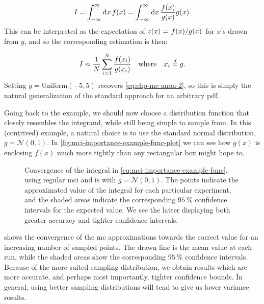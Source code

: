 \documentclass[Thesis.tex]{subfiles}
\begin{document}
\begin{align}
    I = \int_{-\infty}^{\infty}\dd{x}f(x) = \int_{-\infty}^{\infty}\dd{x} \frac{f(x)}{g(x)} g(x).
\end{align}
This can be interpreted as the expectation of $z(x)=\flatfrac{f(x)}{g(x)}$ for $x$'s drawn from $g$, and so the corresponding estimation is then:

\begin{align}
    I \approx \frac{1}{N} \sum_{i=1}^N \frac{f(x_i)}{g(x_i)} \qq{where} x_i\disteq g.
\end{align}
Setting $g = \text{Uniform}(-5, 5)$ recovers \cref{eq:chp-mc-anon-2}, so this is
simply the natural generalization of the standard approach for an arbitrary
\gls{pdf}.


Going back to the example, we should now choose a distribution function that
closely resembles the integrand, while still being simple to sample from. In
this (contrived) example, a natural choice is to use the standard normal
distribution, $g = \mathcal{N}(0, 1)$. In
\cref{fig:mci-importance-example-func-plot} we can see how $g(x)$ is
enclosing $f(x)$ much more tightly than any rectangular box might hope to.

\begin{figure}
   \centering
    \resizebox{0.7\linewidth}{!}{%
        
    }
    \caption[Convergence of Monte Carlo Integration]{\label{fig:mci-importance-example-func-convergence}Convergence of
    the integral in \cref{eq:mci-importance-example-func}, using regular
    \gls{mci} and \gls{is} with $g = \mathcal{N}(0,
    1)$. The points indicate the approximated value of the integral for each
    particular experiment, and the shaded areas indicate the corresponding
    $\SI{95}{\percent}$ confidence intervals for the expected value. We see the
    latter displaying both greater accuracy and tighter confidence intervals.
    }
\end{figure}

 shows the convergence of
the \gls{mc} approximations towards the correct value for an increasing
number of sampled points. The drawn line is the mean value at each run, while
the shaded areas show the corresponding $\SI{95}{\percent}$ confidence
intervals. Because of the more suited sampling distribution, we obtain results
which are more accurate, and perhaps most importantly, tighter confidence
bounds. In general, using better sampling distributions will tend to give us
lower variance results.
\end{document}
